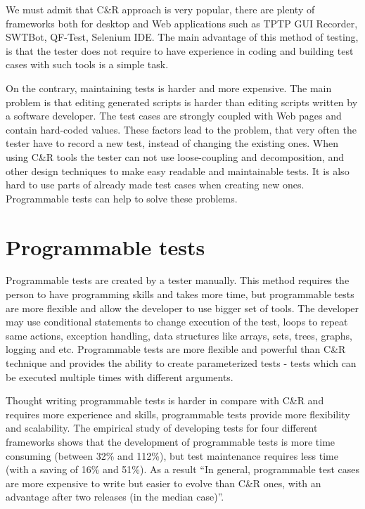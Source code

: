 We must admit that C\&R approach is very popular, there are plenty of
frameworks both for desktop and Web applications such as TPTP GUI Recorder, SWTBot, QF-Test,
Selenium IDE.	The main advantage of this method of testing, is that the tester does not
require to have experience in coding and building test cases with such tools is a simple task. 
			
			On the contrary, maintaining tests is harder and more expensive.
			The main problem is that editing generated scripts is harder than editing
			scripts written by a software developer. The test cases are strongly coupled
			with Web pages and contain hard-coded values. These factors lead to the
			problem, that very often the tester have to record a new test, instead of
			changing the existing ones. When using C\&R tools the tester can
			not use loose-coupling and decomposition, and other design techniques to make
			easy readable and maintainable tests. It is also hard to use parts of already
			made test cases when creating new ones. Programmable tests can help to solve these problems.
			
		\section{Programmable tests} 
		\label{sec:programTests}
			Programmable tests are created by a tester manually. This method requires the
			person to have programming skills and takes more time, but programmable tests
			are more flexible and allow the developer to use bigger set of tools. The
			developer may use conditional statements to change execution of the test,
			loops to repeat same actions, exception handling, data structures like
			arrays, sets, trees, graphs, logging and etc. Programmable tests are more
			flexible and powerful than C\&R technique and provides the ability to create
			parameterized tests - tests which can be executed multiple times with different arguments. 

      Thought writing programmable tests is harder in
      compare with C\&R and requires more experience and skills, programmable tests
      provide more flexibility and scalability. The empirical study
       of developing tests for four different frameworks shows that the development of programmable tests is more time
      consuming (between 32\% and 112\%), but test maintenance requires less
      time (with a saving of 16\% and 51\%). As a result ``In general, programmable test cases are more
      expensive to write but easier to evolve than C\&R ones, with an advantage
      after two releases (in the median case)''.\cite{CaptureReplay7}

